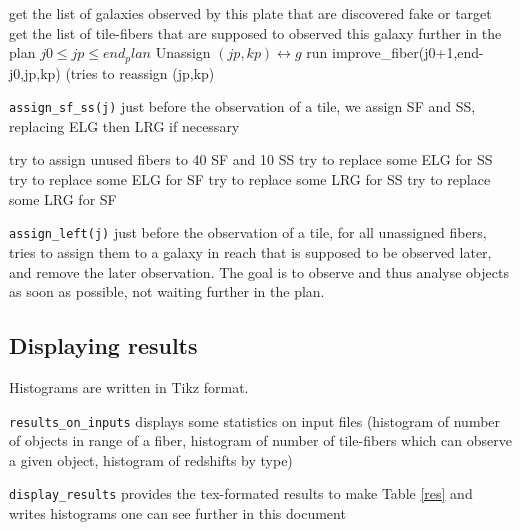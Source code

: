 \documentclass{article}
\begin{document}
\begin{algorithm}[H]
	\caption{Update\_plan\_from\_one\_observation(j0,end\_plan)}\label{euclid}
	\begin{algorithmic}[1]
		\State get the list of galaxies observed by this plate that are discovered fake or target
		\State get the list of tile-fibers that are supposed to observed this galaxy further in the plan $j0\le jp \le end_plan$
		\State Unassign $(jp,kp) \longleftrightarrow g$
		\State run improve\_fiber(j0+1,end-j0,jp,kp) (tries to reassign (jp,kp)
		\EndFor
		\EndFor
	\end{algorithmic}
\end{algorithm}

{\tt assign\_sf\_ss(j)} just before the observation of a tile, we assign SF and SS, replacing ELG then LRG if necessary

\begin{algorithm}[H]
	\caption{assign\_sf\_ss}\label{assignsfss}
	\begin{algorithmic}[1]
		\State try to assign unused fibers to 40 SF and 10 SS
		\State try to replace some ELG for SS
		\State try to replace some ELG for SF
		\EndIf
		\State try to replace some LRG for SS
		\State try to replace some LRG for SF
		\EndIf
		\EndFor
	\end{algorithmic}
\end{algorithm}

{\tt assign\_left(j)} just before the observation of a tile, for all unassigned fibers, tries to assign them to a galaxy in reach that is supposed to be observed later, and remove the later observation. The goal is to observe and thus analyse objects as soon as possible, not waiting further in the plan.


\subsection{Displaying results}
Histograms are written in Tikz format.

{\tt results\_on\_inputs} displays some statistics on input files (histogram of number of objects in range of a fiber, histogram of number of tile-fibers which can observe a given object, histogram of redshifts by type)

{\tt display\_results} provides the tex-formated results to make Table \ref{res} and writes histograms one can see further in this document
\end{document}
